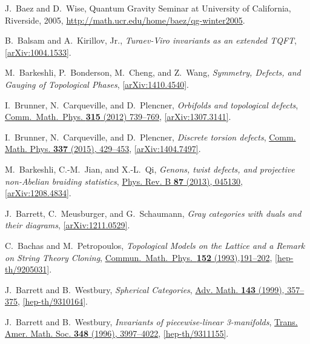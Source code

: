 \documentclass[12pt]{scrartcl}
\newcommand\doi[2]        {\href{http://dx.doi.org/#1}{#2}}
\theoremstyle{definition}
\numberwithin{equation}{section}
\numberwithin{definition}{section}
\numberwithin{figure}{section}
\begin{document}
\begin{thebibliography}{BDSPV}
J.~Baez and D.~Wise, 
Quantum Gravity Seminar at University of California, Riverside, 2005, 
\url{http://math.ucr.edu/home/baez/qg-winter2005}.

B.~Balsam and A.~Kirillov, Jr., 
\textsl{Turaev-Viro invariants as an extended TQFT}, 
\href{http://www.arxiv.org/abs/1004.1533}{[arXiv:1004.1533]}.

M.~Barkeshli, P.~Bonderson, M.~Cheng, and Z.~Wang, 
\textsl{Symmetry, Defects, and Gauging of Topological Phases}, 
\href{http://www.arxiv.org/abs/1410.4540}{[arXiv:1410.4540]}.

I.~Brunner, N.~Carqueville, and D.~Plencner, 
\textsl{Orbifolds and topological defects}, 
\doi{10.1007/s00220-014-2056-3}{Comm.~Math.~Phys. \textbf{315} (2012) 739--769}, 
\href{http://arxiv.org/abs/1307.3141}{[\mbox{arXiv:}1307.3141]}. 

I.~Brunner, N.~Carqueville, and D.~Plencner, 
\textsl{Discrete torsion defects}, 
\doi{10.1007/s00220-015-2297-9}{Comm. Math. Phys. \textbf{337} (2015), 429--453}, 
\href{http://arxiv.org/abs/1404.7497}{[arXiv:1404.7497]}.

M.~Barkeshli, C.-M.~Jian, and X.-L.~Qi, 
\textsl{Genons, twist defects, and projective non-Abelian braiding statistics}, 
\doi{10.1103/PhysRevB.87.045130}{Phys. Rev. B \textbf{87} (2013), 045130}, 
\href{http://www.arxiv.org/abs/1208.4834}{[arXiv:1208.4834]}.

J.~Barrett, C.~Meusburger, and G.~Schaumann, 
\textsl{Gray categories with duals and their diagrams},
\href{http://arxiv.org/abs/1211.0529}{[arXiv:1211.0529]}.

C.~Bachas and M.~Petropoulos, 
\textsl{Topological Models on the Lattice and a Remark on String Theory Cloning}, 
\doi{10.1007/BF02097063}{Commun.~Math.~Phys.~\textbf{152} (1993),191--202}, 
\href{http://www.arxiv.org/abs/hep-th/9205031}{[hep-th/9205031]}.

J.~Barrett and B.~Westbury, 
\textsl{Spherical Categories}, 
\doi{10.1006/aima.1998.1800}{Adv. Math. \textbf{143} (1999), 357--375}, 
\href{http://arxiv.org/abs/hep-th/9310164}{[hep-th/9310164]}.

J.~Barrett and B.~Westbury, 
\textsl{Invariants of piecewise-linear 3-manifolds}, 
\doi{10.1090/S0002-9947-96-01660-1}{Trans. Amer. Math. Soc. \textbf{348} (1996), 3997--4022}, 
\href{http://arxiv.org/abs/hep-th/9311155}{[hep-th/9311155]}.


\end{thebibliography}
\end{document}
